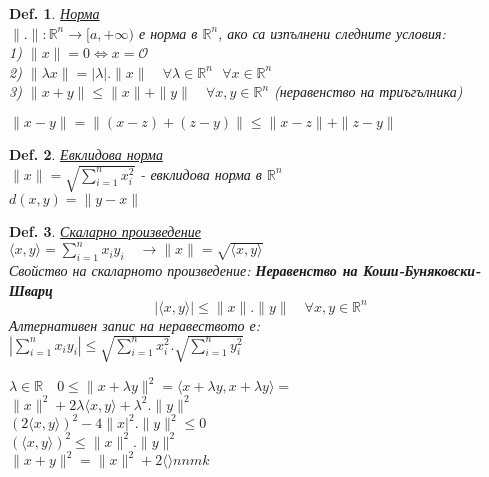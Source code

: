 \documentclass[12pt]{article}
\newtheorem{definition}{Def.}
\newcommand{\spc}{\text{ }}
\begin{document}
	\begin{definition}
		\underline{Норма}\\
		$\|.\|:\mathbb{R}^n \rightarrow [a,+\infty)$ е норма в $\mathbb{R}^n$, ако са изпълнени следните условия:\\
		1) $\|x\|=0 \Leftrightarrow x=\mathcal{O}$\\
		2) $\|\lambda x\| = |\lambda|.\|x\|\quad\forall\lambda\in\mathbb{R}^n\spc\forall x \in\mathbb{R}^n$\\
		3) $\|x+y\|\leq \|x\|+\|y\|\quad\forall x,y \in\mathbb{R}^n$ (неравенство на триъгълника)
	\end{definition}
	$\|x-y\|=\|(x-z)+(z-y)\|\leq\|x-z\|+\|z-y\|$
	\begin{definition}
		\underline{Евклидова норма}\\
		$\|x\|=\sqrt{\sum_{i=1}^{n}x_i^2}$ - евклидова норма в $\mathbb{R}^n $\\
		$d(x,y) = \|y-x\|$
	\end{definition}
	\begin{definition}
		\underline{Скаларно произведение}\\
		$\langle x,y \rangle = \sum_{i=1}^{n}x_i y_i\quad \rightarrow \|x\| = \sqrt{\langle x, y \rangle}$\\
		$\spc$\\
		Свойство на скаларното произведение: \textbf{Неравенство на Коши-Буняковски-Шварц}\\
		\[|\langle x, y \rangle| \leq \|x\|.\|y\|\quad \forall x,y \in \mathbb{R}^n\]
		$\spc$\\
		Алтернативен запис на неравеството е:\\
		$\left|\sum_{i=1}^{n}x_iy_i\right|\leq \sqrt{\sum_{i=1}^{n}x_i^2}.\sqrt{\sum_{i=1}^{n}y_i^2}$\\
		
	\end{definition}
	$\lambda\in\mathbb{R}\quad 0\leq\|x+\lambda y\|^2 = \langle x+\lambda y, x+\lambda y \rangle = $\\
	$\|x\|^2 + 2\lambda \langle x,y \rangle +\lambda^2.\|y\|^2$\\
	$(2\langle x,y \rangle)^2 - 4\|x |^2.\|y\|^2 \leq 0$\\
	$(\langle x,y \rangle)^2 \leq \|x\|^2.\|y\|^2$\\
	$\spc$\\
	$\|x+y\|^2 = \|x\|^2 + 2\langle \rangle nnmk$
	\\
	
\end{document}
